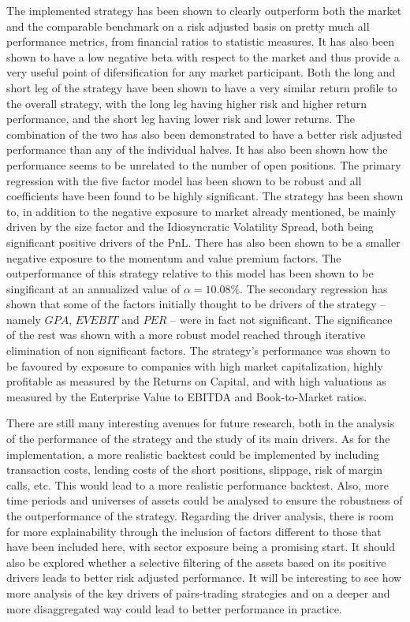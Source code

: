 The implemented strategy has been shown to clearly outperform both the market and the comparable benchmark on a risk adjusted basis on pretty much all performance metrics, from financial ratios to statistic measures. It has also been shown to have a low negative beta with respect to the market and thus provide a very useful point of difersification for any market participant. Both the long and short leg of the strategy have been shown to have a very similar return profile to the overall strategy, with the long leg having higher risk and higher return performance, and the short leg having lower risk and lower returns. The combination of the two has also been demonstrated to have a better risk adjusted performance than any of the individual halves. It has also been shown how the performance seems to be unrelated to the number of open positions. 
The primary regression with the five factor model has been shown to be robust and all coefficients have been found to be highly significant. The strategy has been shown to, in addition to the negative exposure to market already mentioned, be mainly driven by the size factor and the Idiosyncratic Volatility Spread, both being significant positive drivers of the PnL. There has also been shown to be a smaller negative exposure to the momentum and value premium factors. The outperformance of this strategy relative to this model has been shown to be singificant at an annualized value of $\alpha=10.08\%$. 
The secondary regression has shown that some of the factors initially thought to be drivers of the strategy -- namely $GPA$, $EVEBIT$ and $PER$ -- were in fact not significant. The significance of the rest was shown with a more robust model reached through iterative elimination of non significant factors. The strategy's performance was shown to be favoured by exposure to companies with high market capitalization, highly profitable as measured by the Returns on Capital, and with high valuations as measured by the Enterprise Value to EBITDA and Book-to-Market ratios. 

There are still many interesting avenues for future research, both in the analysis of the performance of the strategy and the study of its main drivers. 
As for the implementation, a more realistic backtest could be implemented by including transaction costs, lending costs of the short positions, slippage, risk of margin calls, etc. This would lead to a more realistic performance backtest. Also, more time periods and universes of assets could be analysed to ensure the robustness of the outperformance of the strategy.
Regarding the driver analysis, there is room for more explainability through the inclusion of factors different to those that have been included here, with sector exposure being a promising start. It should also be explored whether a selective filtering of the assets based on its positive drivers leads to better risk adjusted performance. It will be interesting to see how more analysis of the key drivers of pairs-trading strategies and on a deeper and more disaggregated way could lead to better performance in practice.